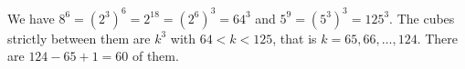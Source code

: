 We have $8^6=(2^3)^6=2^{18}=(2^6)^3=64^3$ and $5^9=(5^3)^3=125^3$. The cubes strictly between them are $k^3$ with $64<k<125$, that is $k=65,66,\dots,124$. There are $124-65+1=\boxed{60}$ of them.
